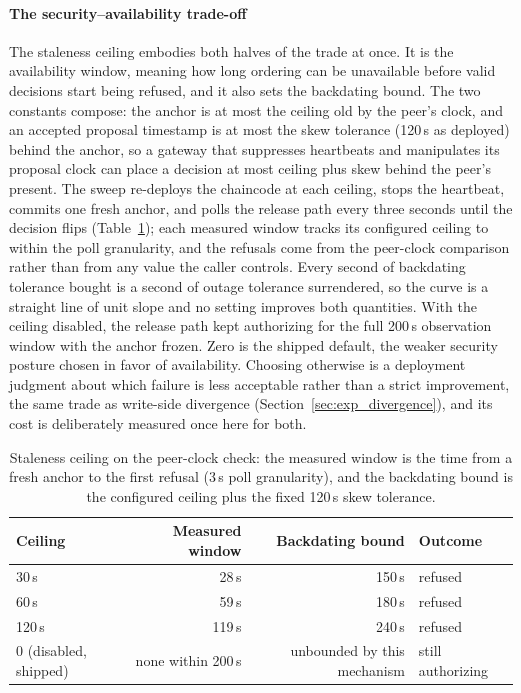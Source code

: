 \documentclass[preprint,12pt]{elsarticle}
\begin{document}
\paragraph{The security--availability trade-off}
The staleness ceiling embodies both halves of the trade at once. It is the
availability window, meaning how long ordering can be unavailable before valid
decisions start being refused, and it also sets the backdating bound. The two
constants compose: the anchor is at most the ceiling old by the peer's clock,
and an accepted proposal timestamp is at most the skew tolerance (120\,s as
deployed) behind the anchor, so a gateway that suppresses heartbeats and
manipulates its proposal clock can place a decision at most ceiling plus skew
behind the peer's present. The sweep re-deploys the chaincode at each ceiling,
stops the heartbeat, commits one fresh anchor, and polls the release path
every three seconds until the decision flips (Table~\ref{tab:staleness});
each measured window tracks its configured ceiling to within the poll
granularity, and the refusals come from the peer-clock comparison rather than
from any value the caller controls. Every second of backdating tolerance
bought is a second of outage tolerance surrendered, so the curve is a straight
line of unit slope and no setting improves both quantities. With the ceiling
disabled, the release path kept authorizing for the full 200\,s observation
window with the anchor frozen. Zero is the shipped default, the weaker
security posture chosen in favor of availability. Choosing otherwise is a
deployment judgment about which failure is less acceptable rather than a
strict improvement, the same trade as write-side divergence
(Section~\ref{sec:exp_divergence}), and its cost is deliberately measured
once here for both.

\begin{table}[!t]
\centering
\caption{Staleness ceiling on the peer-clock check: the measured window is
the time from a fresh anchor to the first refusal (3\,s poll granularity),
and the backdating bound is the configured ceiling plus the fixed 120\,s skew
tolerance.}
\label{tab:staleness}
\footnotesize
\setlength{\tabcolsep}{6pt}
\begin{tabular}{@{}lrrl@{}}
\toprule
Ceiling & Measured window & Backdating bound & Outcome \\
\midrule
30\,s  & 28\,s  & 150\,s & refused \\
60\,s  & 59\,s  & 180\,s & refused \\
120\,s & 119\,s & 240\,s & refused \\
0 (disabled, shipped) & none within 200\,s & unbounded by this mechanism & still authorizing \\
\bottomrule
\end{tabular}
\end{table}
\end{document}

